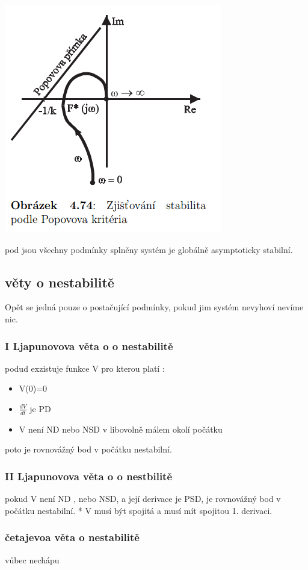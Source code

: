 \begin{itemize}
        \includegraphics{img/popov_frek.png}
\end{itemize}
pod jsou všechny podmínky splněny systém je globálně asymptoticky stabilní.

\subsection{věty o nestabilitě}
Opět se jedná pouze o postačující podmínky, pokud jim systém nevyhoví nevíme nic.

\subsubsection{I Ljapunovova věta o o nestabilitě}
podud exzistuje funkce V pro kterou platí :
\begin{itemize}
    \item V(0)=0
    \item $\frac{dV}{dt}$ je PD
    \item V není ND nebo NSD v libovolně málem okolí počátku
\end{itemize}
poto je rovnovážný bod v počátku nestabilní.

\subsubsection{II Ljapunovova věta o o nestbilitě}
pokud V není ND , nebo NSD, a její derivace je PSD, je rovnovážný bod v počátku nestabilní.
* V musí být spojitá a musí mít spojitou 1. derivaci.
\subsubsection{četajevoa věta o nestabilitě}
vůbec nechápu

